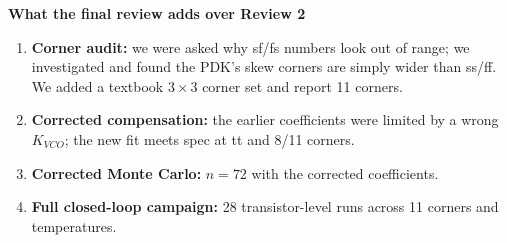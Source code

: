 \documentclass[11pt,a4paper]{article}
\begin{document}
\noindent\textbf{What the final review adds over Review 2}
\begin{enumerate}
\item \textbf{Corner audit:} we were asked why sf/fs numbers look out of range; we investigated and found the PDK's skew corners are simply wider than ss/ff. We added a textbook $3\times3$ corner set and report 11 corners.
\item \textbf{Corrected compensation:} the earlier coefficients were limited by a wrong $K_{VCO}$; the new fit meets spec at tt and 8/11 corners.
\item \textbf{Corrected Monte Carlo:} $n=72$ with the corrected coefficients.
\item \textbf{Full closed-loop campaign:} 28 transistor-level runs across 11 corners and temperatures.
\end{enumerate}

\end{document}
